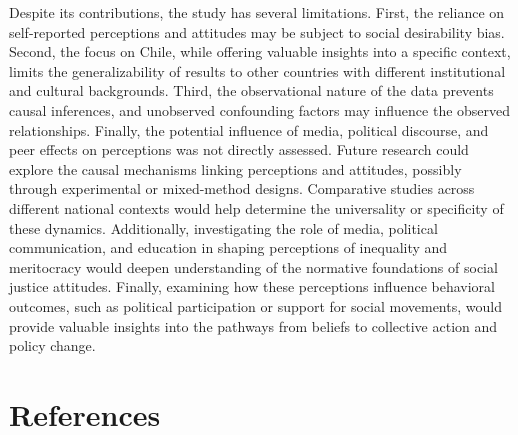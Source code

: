 \documentclass[
  12pt,
]{article}
\begin{document}
Despite its contributions, the study has several limitations. First, the
reliance on self-reported perceptions and attitudes may be subject to
social desirability bias. Second, the focus on Chile, while offering
valuable insights into a specific context, limits the generalizability
of results to other countries with different institutional and cultural
backgrounds. Third, the observational nature of the data prevents causal
inferences, and unobserved confounding factors may influence the
observed relationships. Finally, the potential influence of media,
political discourse, and peer effects on perceptions was not directly
assessed. Future research could explore the causal mechanisms linking
perceptions and attitudes, possibly through experimental or mixed-method
designs. Comparative studies across different national contexts would
help determine the universality or specificity of these dynamics.
Additionally, investigating the role of media, political communication,
and education in shaping perceptions of inequality and meritocracy would
deepen understanding of the normative foundations of social justice
attitudes. Finally, examining how these perceptions influence behavioral
outcomes, such as political participation or support for social
movements, would provide valuable insights into the pathways from
beliefs to collective action and policy change.

\hypertarget{references}{%
\section{References}\label{references}}
\end{document}
